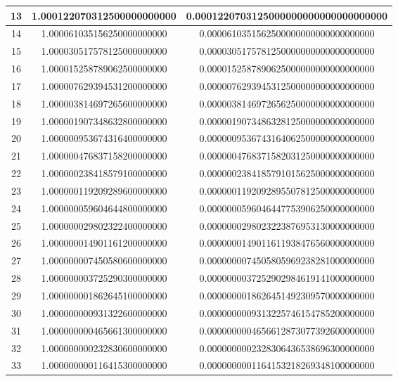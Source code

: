 \documentclass{article}
\begin{document}
\begin{itemize}
\begin{longtable}{|c||c|c|}
		13 & 1.000122070312500000000000 & 0.0001220703125000000000000000000000 \\ \hline 
		14 & 1.000061035156250000000000 & 0.0000610351562500000000000000000000 \\ \hline 
		15 & 1.000030517578125000000000 & 0.0000305175781250000000000000000000 \\ \hline 
		16 & 1.000015258789062500000000 & 0.0000152587890625000000000000000000 \\ \hline 
		17 & 1.000007629394531200000000 & 0.0000076293945312500000000000000000 \\ \hline 
		18 & 1.000003814697265600000000 & 0.0000038146972656250000000000000000 \\ \hline 
		19 & 1.000001907348632800000000 & 0.0000019073486328125000000000000000 \\ \hline 
		20 & 1.000000953674316400000000 & 0.0000009536743164062500000000000000 \\ \hline 
		21 & 1.000000476837158200000000 & 0.0000004768371582031250000000000000 \\ \hline 
		22 & 1.000000238418579100000000 & 0.0000002384185791015625000000000000 \\ \hline 
		23 & 1.000000119209289600000000 & 0.0000001192092895507812500000000000 \\ \hline 
		24 & 1.000000059604644800000000 & 0.0000000596046447753906250000000000 \\ \hline 
		25 & 1.000000029802322400000000 & 0.0000000298023223876953130000000000 \\ \hline 
		26 & 1.000000014901161200000000 & 0.0000000149011611938476560000000000 \\ \hline 
		27 & 1.000000007450580600000000 & 0.0000000074505805969238281000000000 \\ \hline 
		28 & 1.000000003725290300000000 & 0.0000000037252902984619141000000000 \\ \hline 
		29 & 1.000000001862645100000000 & 0.0000000018626451492309570000000000 \\ \hline 
		30 & 1.000000000931322600000000 & 0.0000000009313225746154785200000000 \\ \hline 
		31 & 1.000000000465661300000000 & 0.0000000004656612873077392600000000 \\ \hline 
		32 & 1.000000000232830600000000 & 0.0000000002328306436538696300000000 \\ \hline 
		33 & 1.000000000116415300000000 & 0.0000000001164153218269348100000000 \\ \hline 

\end{longtable}
\end{itemize}
\end{document}
